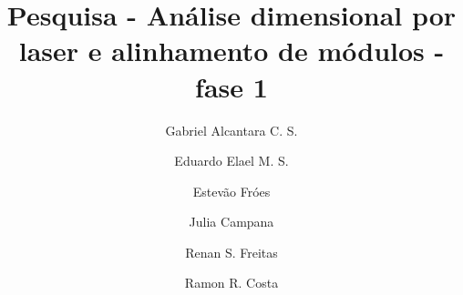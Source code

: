 \documentclass{main}
\begin{document}
\begin{frontmatter}

\title{Pesquisa - Análise dimensional por laser e alinhamento de módulos -  fase
1}
 
\author[1]{Gabriel Alcantara C. S.}
\author[1]{Eduardo Elael M. S.}
\author[1]{Estevão Fróes}
\author[2]{Julia Campana}
\author[1]{Renan S. Freitas}
\author[1]{Ramon R. Costa}

  \address[1]{Departamento de Engenharia Elétrica, COPPE UFRJ, Rio de Janeiro,
  Brasil} 
  
  \address[2]{Fundação Coordenação de Projetos, Pesquisas e Estudos Tecnológicos
  (COPPETEC), Rio de Janeiro, Brasil}
  
 

\end{frontmatter}





 
\appendix 
\end{document}
